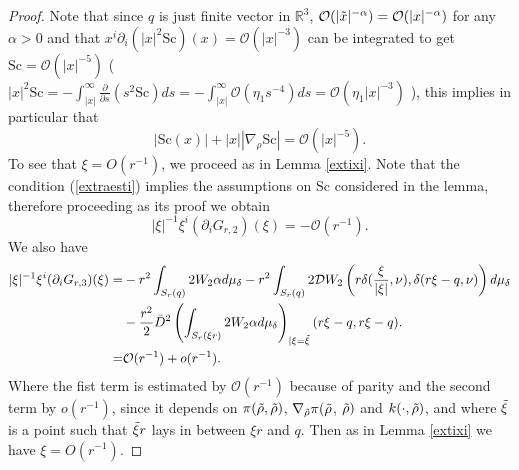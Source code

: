 \documentclass[12pt,a4paper]{amsart}
\theoremstyle{plain}
\theoremstyle{definition}
\begin{document}
\begin{proof}
Note that since $q$ is just finite vector in $\mathbb{R}^3 $,   $\mathcal{O}(|\Tilde{x}|^{-\alpha})= \mathcal{O}(|x|^{-\alpha})$ for any $\alpha>0$ and that   $x^i \partial_i (| x|^2 \mathrm{Sc})(x) = \mathcal{O}( | x|^{-3})$ can be integrated to get $\mathrm{Sc} = \mathcal{O}( | x|^{-5})$ ( $ |x|^2 \mathrm{Sc} = - \int_{|x|}^\infty  \frac{\partial}{\partial s} (s^2 \mathrm{Sc}) ds = - \int_{|x|}^\infty  \mathcal{O}(\eta_1 s^{-4})  ds = \mathcal{O}(\eta_1|x|^{-3})$ ), this implies in particular that 
\begin{equation}\label{extraesti}
        |\mathrm{Sc}( x)| +|x | |\nabla_{\rho }\mathrm{Sc}|  = \mathcal{O}(|x|^{-5}).
    \end{equation}
To see that $\xi = O(r^{-1})$, we proceed as in Lemma \ref{extixi}. Note that the condition (\ref{extraesti}) implies the assumptions on $\mathrm{Sc}$ considered in the lemma, therefore proceeding as its proof we obtain 
\begin{equation}
         |\xi|^{-1} \xi^i (\partial_i G_{r,2})(\xi) =  - \mathcal{O} (r^{-1}).
\end{equation}
 We also have 
\begin{equation}
\begin{split}
  |\xi|^{-1} \xi^i (\partial_i G_{r,3})(\xi) =& -r^2 \int_{S_{r}(q)}   2 W_2 \alpha d\mu_\delta -  r^2\int_{S_{r}(q)}   2 \mathcal{D}W_2\left(r \delta( \frac{\xi}{|\xi|}, \nu ),  \delta( r\xi-q, \nu ) \right) d\mu_\delta \\
 &- \frac{r^2}{2} \Bar{D}^2 \left(\int_{S_{r}(\xi r)}  2 W_2 \alpha d\mu_\delta\right)_{|\xi = \Tilde{\xi}}(r \xi-q, r \xi-q).\\
 =&  \mathcal{O}(r^{-1}) + o(r^{-1}). 
 \end{split}
\end{equation}
Where the fist term is estimated by $ \mathcal{O}(r^{-1})$ because of parity and the second term by $ o(r^{-1})$, since it depends on $\pi (\Tilde{\rho},\Tilde{\rho})$,  $\nabla_{\Tilde{\rho}} \pi (\Tilde{\rho}$, $ \Tilde{\rho})$ and  $k(\cdot, \Tilde{\rho}) $, and where $\Tilde{\xi}$ is a point such that $\Tilde{\xi}r$ lays in  between $\xi r$ and $q$. Then as in Lemma \ref{extixi} we have $\xi = O(r^{-1})$. 


\end{proof}
\end{document}
